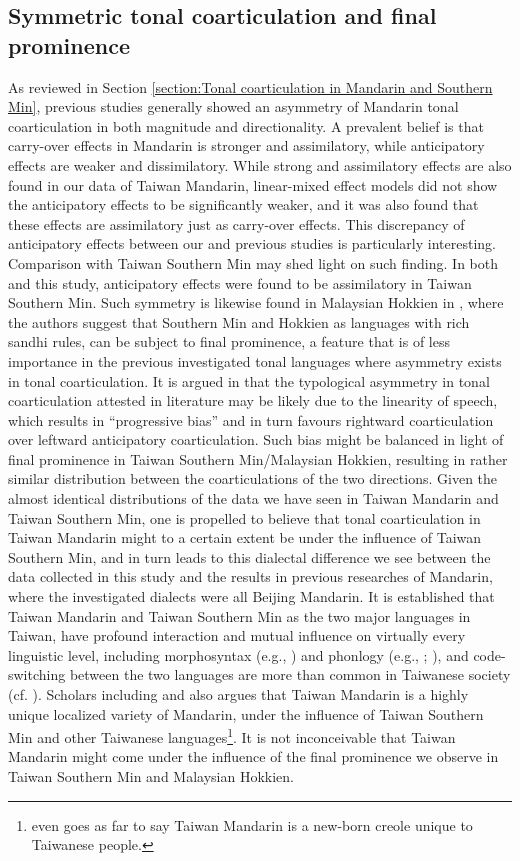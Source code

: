 \subsection{Symmetric tonal coarticulation and final prominence}
As reviewed in Section \ref{section:Tonal coarticulation in Mandarin and Southern Min}, previous studies generally showed an asymmetry of Mandarin tonal coarticulation in both magnitude and directionality. A prevalent belief is that carry-over effects in Mandarin is stronger and assimilatory, while anticipatory effects are weaker and dissimilatory. While strong and assimilatory effects are also found in our data of Taiwan Mandarin, linear-mixed effect models did not show the anticipatory effects to be significantly weaker, and it was also found that these effects are assimilatory just as carry-over effects. This discrepancy of anticipatory effects between our and previous studies is particularly interesting. Comparison with Taiwan Southern Min may shed light on such finding. In both \cite{Peng1997} and this study, anticipatory effects were found to be assimilatory in Taiwan Southern Min. Such symmetry is likewise found in Malaysian Hokkien in \cite{ChangHsieh2012}, where the authors suggest that Southern Min and Hokkien as languages with rich sandhi rules, can be subject to final prominence, a feature that is of less importance in the previous investigated tonal languages where asymmetry exists in tonal coarticulation. It is argued in \cite{ChangHsieh2012} that the typological asymmetry in tonal coarticulation attested in literature may be likely due to the linearity of speech, which results in ``progressive bias'' and in turn favours rightward coarticulation over leftward anticipatory coarticulation. Such bias might be balanced in light of final prominence in Taiwan Southern Min/Malaysian Hokkien, resulting in rather similar distribution between the coarticulations of the two directions. Given the almost identical distributions of the data we have seen in Taiwan Mandarin and Taiwan Southern Min, one is propelled to believe that tonal coarticulation in Taiwan Mandarin might to a certain extent be under the influence of Taiwan Southern Min, and in turn leads to this dialectal difference we see between the data collected in this study and the results in previous researches of Mandarin, where the investigated dialects were all Beijing Mandarin. It is established that Taiwan Mandarin and Taiwan Southern Min as the two major languages in Taiwan, have profound interaction and mutual influence on virtually every linguistic level, including morphosyntax (e.g., \citealp{Li2008}) and phonlogy (e.g., \citealp{ChuangFon2010}; \citealp{Li2010}), and code-switching between the two languages are more than common in Taiwanese society (cf. \citealp{Yang2021}). Scholars including \cite{Her2012} and \cite{Su2018} also argues that Taiwan Mandarin is a highly unique localized variety of Mandarin, under the influence of Taiwan Southern Min and other Taiwanese languages\footnote{\citeauthor{Her2012} even goes as far to say Taiwan Mandarin is a new-born creole  unique to Taiwanese people.}. It is not inconceivable that Taiwan Mandarin might come under the influence of the final prominence we observe in Taiwan Southern Min and Malaysian Hokkien.

